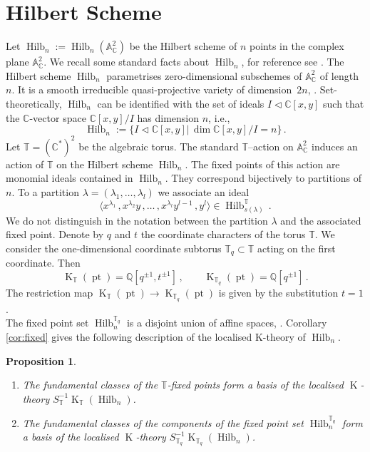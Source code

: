 \documentclass[12pt,a4paper]{amsart}
\theoremstyle{plain}
\newtheorem{pro}[tw]{Proposition}
\theoremstyle{definition}
\theoremstyle{remark}
\newcommand{\Hilb}[1]{\operatorname{Hilb}_{{#1}}}
\newcommand{\pt}{\operatorname{pt}}
\newcommand{\QQ}{\mathbb{Q}}
\newcommand{\CC}{\mathbb{C}}
\newcommand{\Aa}{\mathbb{A}}
\newcommand{\TT}{\mathbb{T}}
\newcommand{\Tq}{{\mathbb{T}_q}}
\DeclareMathOperator{\KTh}{K}
\begin{document}
\section{Hilbert Scheme} \label{s:Hilb}
Let $\Hilb{n} := \Hilb{n}(\Aa_{\CC}^2)$ be the Hilbert scheme of $n$ points in the complex plane $\Aa_{\CC}^2$. We recall some standard facts about $\Hilb{n}$, for reference see \cite{Nak1}. 
The Hilbert scheme $\Hilb{n}$ parametrises zero-dimensional subschemes of $\Aa_{\CC}^2$ of length $n$. It is a smooth irreducible quasi-projective variety of dimension~$2n$, \cite{Fogarty}. Set-theoretically, $\Hilb{n}$ can be identified with the set of ideals $I \lhd \CC[x,y]$ such that the $\CC$-vector space $\CC[x,y]/I$ has dimension $n$, i.e.,
$$\Hilb{n}:=\{I \lhd \CC[x,y]|\, \dim \CC[x,y]/I=n\}\,.$$
Let $\TT=(\CC^{\ast})^2$ be the algebraic torus. The standard $\TT$--action on $\Aa_{\CC}^2$
induces an action of $\TT$ on the Hilbert scheme $\Hilb{n}$. The fixed points of this action are monomial ideals contained in $\Hilb{n}$. They correspond bijectively to partitions of $n$. To a partition $\lambda=(\lambda_1,\dots,\lambda_l)$ we associate an ideal
$$
\langle x^{\lambda_1}\,, x^{\lambda_2}y\,,\dots\,, x^{\lambda_l}y^{l-1}\,, y^l \rangle \in \Hilb{s(\lambda)}^\TT\,.
$$
We do not distinguish in the notation between the partition $\lambda$ and the associated fixed point.
\noindent Denote by $q$ and $t$ the coordinate characters of the torus $\TT$. We consider the one-dimensional coordinate subtorus $\Tq\subset \TT$ acting on the first coordinate. 
Then
$$\KTh_\TT(\pt) = \QQ[q^{\pm 1},t^{\pm 1}]\,,\qquad \KTh_\Tq(\pt)=\QQ[q^{\pm 1}]\,.$$
The restriction map $\KTh_\TT(\pt)\to \KTh_\Tq(\pt)$ is given by the substitution $t=1$. \\

The fixed point set $\Hilb{n}^\Tq$ is a disjoint union of affine spaces, \cite[Section 1.2]{Evain}.  Corollary \ref{cor:fixed} gives the following description of the localised K-theory of $\Hilb{n}$.
\begin{pro} \label{pro:localised}
	\begin{enumerate}
		\item The fundamental classes of the $\TT$-fixed points form a basis of the localised $\KTh$-theory $S^{-1}_\TT\KTh_\TT(\Hilb{n})$.
		\item The fundamental classes of the components of the fixed point set $\Hilb{n}^\Tq$ form a basis of the localised $\KTh$-theory $S^{-1}_\Tq\KTh_\Tq(\Hilb{n})$.
	\end{enumerate}
\end{pro}
\end{document}

